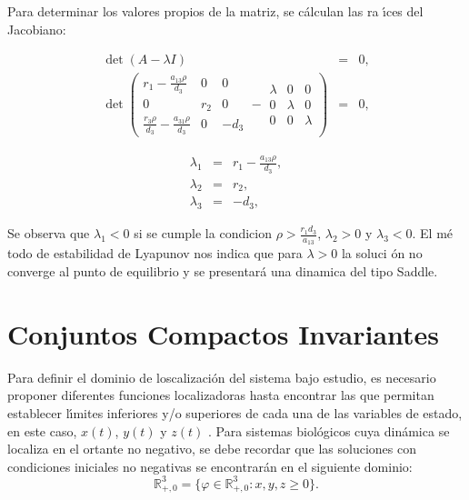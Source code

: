 \documentclass[letterpaper,11pt]{article}
\begin{document}
Para determinar los valores propios de la matriz, se c\'{a}lculan las ra%
\'{\i}ces del Jacobiano:

\begin{eqnarray*}
\det (A-\lambda I) &=&0, \\
\det (%
\begin{array}{ccc}
r_{1}-\frac{a_{13}\rho }{d_{3}} & 0 & 0 \\ 
0 & r_{2} & 0 \\ 
\frac{r_{3}\rho }{d_{3}}-\frac{a_{31}\rho }{d_{3}} & 0 & -d_{3}%
\end{array}%
-%
\begin{array}{ccc}
\lambda & 0 & 0 \\ 
0 & \lambda & 0 \\ 
0 & 0 & \lambda%
\end{array}%
) &=&0,
\end{eqnarray*}

\begin{eqnarray*}
\lambda _{1} &=&r_{1}-\frac{a_{13}\rho }{d_{3}}, \\
\lambda _{2} &=&r_{2}, \\
\lambda _{3} &=&-d_{3},
\end{eqnarray*}

\bigskip Se observa que $\lambda _{1}<0$ si se cumple la condicion $\rho >%
\frac{r_{1}d_{3}}{a_{13}}$, $\lambda _{2}>0$ y $\lambda _{3}<0$. El m\'{e}%
todo de estabilidad de Lyapunov nos indica que para $\lambda >0$ la soluci%
\'{o}n no converge al punto de equilibrio y se presentar\'{a} una dinamica
del tipo Saddle.

\section{Conjuntos Compactos Invariantes}

\qquad Para definir el dominio de loscalizaci\'{o}n del sistema bajo
estudio, es necesario proponer diferentes funciones localizadoras hasta
encontrar las que permitan establecer l\'{\i}mites inferiores y/o superiores
de cada una de las variables de estado, en este caso, $x(t)$, $y(t)$ y $z(t)$%
. Para sistemas biol\'{o}gicos cuya din\'{a}mica se localiza en el ortante
no negativo, se debe recordar que las soluciones con condiciones iniciales
no negativas se encontrar\'{a}n en el siguiente dominio:%
\begin{equation*}
\mathbb{R}
_{+,0}^{3}=\{\varphi \in 
\mathbb{R}
_{+,0}^{3}:x,y,z\geq 0\}.
\end{equation*}
\end{document}
